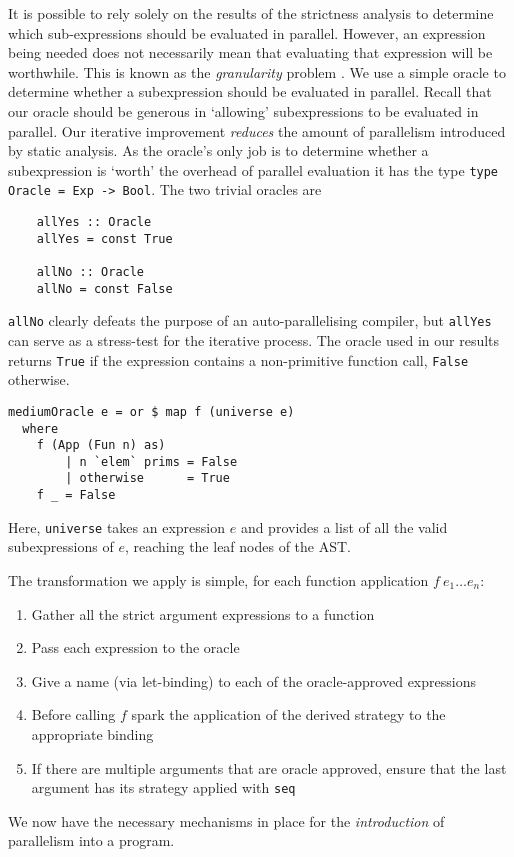It is possible to rely solely on the results of the strictness analysis to
determine which sub-expressions should be evaluated in parallel. However, an
expression being needed does not necessarily mean that evaluating that
expression will be worthwhile. This is known as the \emph{granularity} problem
\citep{hammond2000research}. We use a simple oracle to determine whether a
subexpression should be evaluated in parallel. Recall that our oracle should be
generous in `allowing' subexpressions to be evaluated in parallel. Our
iterative improvement \emph{reduces} the amount of parallelism introduced by
static analysis. As the oracle's only job is to determine whether a
subexpression is `worth' the overhead of parallel evaluation it has the type
\verb+type Oracle = Exp -> Bool+. The two trivial oracles are

\begin{verbatim}
    allYes :: Oracle
    allYes = const True

    allNo :: Oracle
    allNo = const False
\end{verbatim}

\verb-allNo- clearly defeats the purpose of an auto-parallelising compiler, but
\verb-allYes- can serve as a stress-test for the iterative process. The oracle
used in our results returns \verb-True- if the expression contains a non-primitive
function call, \verb-False- otherwise.

\begin{verbatim}
mediumOracle e = or $ map f (universe e)
  where
    f (App (Fun n) as)
        | n `elem` prims = False
        | otherwise      = True
    f _ = False
\end{verbatim}

Here, \verb-universe- takes an expression $e$ and provides a list of all the
valid subexpressions of $e$, reaching the leaf nodes of the AST.

The transformation we apply is simple, for each function application $f \ e_{1}
\dots e_{n}$:

\begin{enumerate}
    \item Gather all the strict argument expressions to a function
    \item Pass each expression to the oracle
    \item Give a name (via let-binding) to each of the oracle-approved expressions
    \item Before calling $f$ spark the application of the derived
        strategy to the appropriate binding
    \item If there are multiple arguments that are oracle approved, ensure that
        the last argument has its strategy applied with \verb-seq-
\end{enumerate}

We now have the necessary mechanisms in place for the \emph{introduction} of
parallelism into a program.
